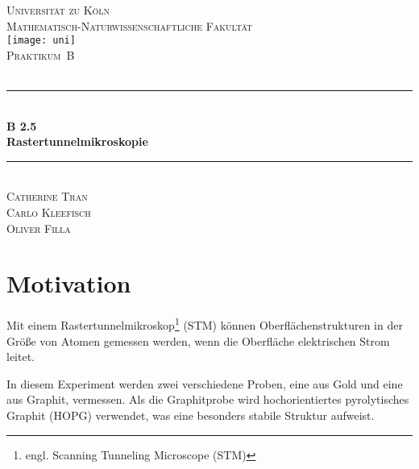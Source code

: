\documentclass[12pt,a4paper]{scrartcl}
\numberwithin{equation}{section} %
\newcommand{\HRule}{\rule{\linewidth}{0.7mm}}
\renewcommand{\[}{} %
\renewcommand{\]}{\noindent} %
\begin{document}
\begin{titlepage}
	\pagestyle{empty}

	\begin{center}

	\textsc{\LARGE Universität zu Köln }\\ [0.4cm]
	\textsc{Mathematisch-Naturwissenschaftliche Fakultät} \\[1.5cm]

	\texttt{[image: uni]}\\[1.5cm]  %

	\textsc{\Large Praktikum~B}\\[2mm]
	\textsc{}\\[10mm]
	\HRule \\[0.4cm]

		{	\Huge \bfseries B 2.5}\\[0.4cm]
			{	\huge \bfseries Rastertunnelmikroskopie}\\[0.3cm]
	
	\HRule \\[3cm]

			\textsc{\Large Catherine Tran } \\[3pt]
		\textsc{\Large Carlo Kleefisch } \\[3pt]
		\textsc{\Large Oliver Filla } \\[3pt]
		
	\end{center}
\end{titlepage}

\newpage
\tableofcontents
\newpage

\hypertarget{motivation}{%
\section{Motivation}\label{motivation}}

Mit einem Rastertunnelmikroskop\footnote{engl. Scanning Tunneling
  Microscope (STM)} (STM) können Oberflächenstrukturen in der Größe von
Atomen gemessen werden, wenn die Oberfläche elektrischen Strom leitet.

In diesem Experiment werden zwei verschiedene Proben, eine aus Gold und
eine aus Graphit, vermessen. Als die Graphitprobe wird hochorientiertes
pyrolytisches Graphit (HOPG) verwendet, was eine besonders stabile
Struktur aufweist.
\end{document}
